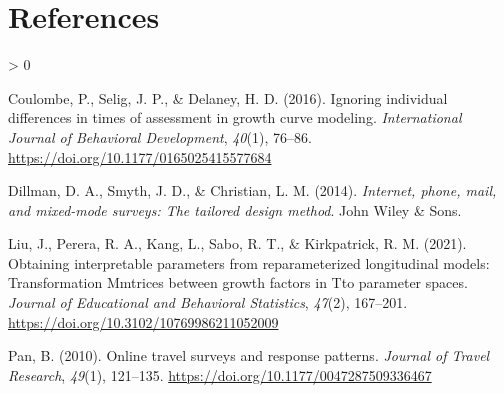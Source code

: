 \documentclass[
12pt, %
twoside,
english]{guelphthesis}
\newlength{\cslhangindent}
\newenvironment{CSLReferences}[2] %
 {%
  \setlength{\parindent}{0pt}
  \ifodd #1 \everypar{\setlength{\hangindent}{\cslhangindent}}\ignorespaces\fi
  \ifnum #2 > 0
  \setlength{\parskip}{\linespacing{2}}
  \fi
 }%
 {}
\begin{document}
\hypertarget{references}{%
\chapter{References}\label{references}}

\begingroup

\hypertarget{refs}{}
\begin{CSLReferences}{1}{0}
\leavevmode{}%
Coulombe, P., Selig, J. P., \& Delaney, H. D. (2016). Ignoring individual differences in times of assessment in growth curve modeling. \emph{International Journal of Behavioral Development}, \emph{40}(1), 76--86. \url{https://doi.org/10.1177/0165025415577684}

\leavevmode{}%
Dillman, D. A., Smyth, J. D., \& Christian, L. M. (2014). \emph{Internet, phone, mail, and mixed-mode surveys: The tailored design method}. John Wiley \& Sons.

\leavevmode{}%
Liu, J., Perera, R. A., Kang, L., Sabo, R. T., \& Kirkpatrick, R. M. (2021). Obtaining interpretable parameters from reparameterized longitudinal models: Transformation Mmtrices between growth factors in Tto parameter spaces. \emph{Journal of Educational and Behavioral Statistics}, \emph{47}(2), 167--201. \url{https://doi.org/10.3102/10769986211052009}

\leavevmode{}%
Pan, B. (2010). Online travel surveys and response patterns. \emph{Journal of Travel Research}, \emph{49}(1), 121--135. \url{https://doi.org/10.1177/0047287509336467}

\end{CSLReferences}
\endgroup
\end{document}
